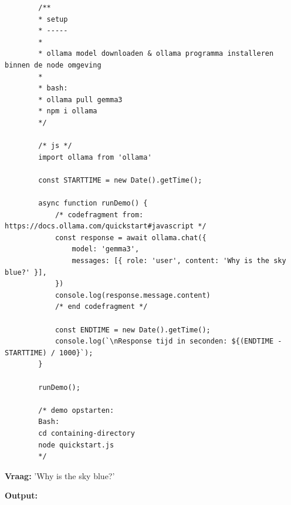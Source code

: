 \begin{listing}
    \begin{verbatim}
        /**
        * setup
        * -----
        * 
        * ollama model downloaden & ollama programma installeren binnen de node omgeving
        * 
        * bash:
        * ollama pull gemma3
        * npm i ollama
        */
        
        /* js */
        import ollama from 'ollama'
        
        const STARTTIME = new Date().getTime();
        
        async function runDemo() {
            /* codefragment from: https://docs.ollama.com/quickstart#javascript */
            const response = await ollama.chat({
                model: 'gemma3',
                messages: [{ role: 'user', content: 'Why is the sky blue?' }],
            })
            console.log(response.message.content)
            /* end codefragment */
            
            const ENDTIME = new Date().getTime();
            console.log(`\nResponse tijd in seconden: ${(ENDTIME - STARTTIME) / 1000}`);
        }
        
        runDemo();
        
        /* demo opstarten:
        Bash:
        cd containing-directory
        node quickstart.js
        */
    \end{verbatim}
    \caption[Ollama Javascript Code]{Code om te communiceren met \textit{gemma3:4b}.}
    \label{lst:ollama-javascript-test}
\end{listing}

\textbf{Vraag:} 'Why is the sky blue?'

\textbf{Output:}

